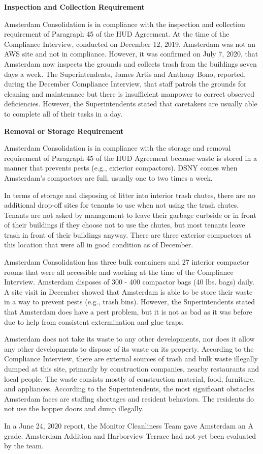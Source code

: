 

\textbf{Inspection and Collection Requirement}

Amsterdam Consolidation is in compliance with the inspection and collection requirement of Paragraph 45 of the HUD Agreement. At the time of the Compliance Interview, conducted on December 12, 2019, Amsterdam was not an AWS site and not in compliance. However, it was confirmed on July 7, 2020, that Amsterdam now inspects the grounds and collects trash from the buildings seven days a week. The Superintendents, James Artis and Anthony Bono, reported, during the December Compliance Interview, that staff patrols the grounds for cleaning and maintenance but there is insufficient manpower to correct observed deficiencies. However, the Superintendents stated that caretakers are usually able to complete all of their tasks in a day.

\textbf{Removal or Storage Requirement}

Amsterdam Consolidation is in compliance with the storage and removal requirement of Paragraph 45 of the HUD Agreement because waste is stored in a manner that prevents pests (e.g., exterior compactors). DSNY comes when Amsterdam's compactors are full, usually one to two times a week.

In terms of storage and disposing of litter into interior trash chutes, there are no additional drop-off sites for tenants to use when not using the trash chutes. Tenants are not asked by management to leave their garbage curbside or in front of their buildings if they choose not to use the chutes, but most tenants leave trash in front of their buildings anyway. There are three exterior compactors at this location that were all in good condition as of December.

Amsterdam Consolidation has three bulk containers and 27 interior compactor rooms that were all accessible and working at the time of the Compliance Interview. Amsterdam disposes of 300 - 400 compactor bags (40 lbs. bags) daily. A site visit in December showed that Amsterdam is able to be store their waste in a way to prevent pests (e.g., trash bins). However, the Superintendents stated that Amsterdam does have a pest problem, but it is not as bad as it was before due to help from consistent extermination and glue traps. 

Amsterdam does not take its waste to any other developments, nor does it allow any other developments to dispose of its waste on its property. According to the Compliance Interview, there are external sources of trash and bulk waste illegally dumped at this site, primarily by construction companies, nearby restaurants and local people. The waste consists mostly of construction material, food, furniture, and appliances. According to the  Superintendents, the most significant obstacles Amsterdam faces are staffing shortages and resident behaviors. The residents do not use the hopper doors and dump illegally. 

In a June 24, 2020 report, the Monitor Cleanliness Team gave Amsterdam an A grade. Amsterdam Addition and Harborview Terrace had not yet been evaluated by the team. 